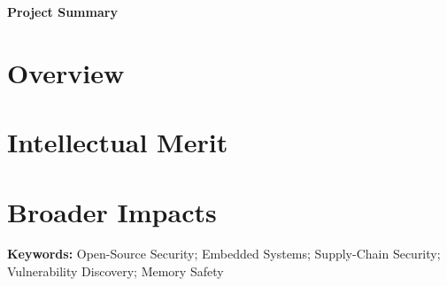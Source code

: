 \documentclass[11pt,oneside,onecolumn,letterpaper]{article}
\begin{document}
\normalsize

\renewcommand{\baselinestretch}{1.2}
\normalsize
\centerline{\textbf{\Large Project Summary}}
\vspace{0.1in}

\renewcommand{\baselinestretch}{1.0}
\normalsize


\section*{Overview}

\section*{Intellectual Merit}

\section*{Broader Impacts}

\textbf{Keywords:} Open-Source Security; Embedded Systems; Supply-Chain Security; Vulnerability Discovery; Memory Safety

\setcounter{page}{1} \normalsize
\end{document}
